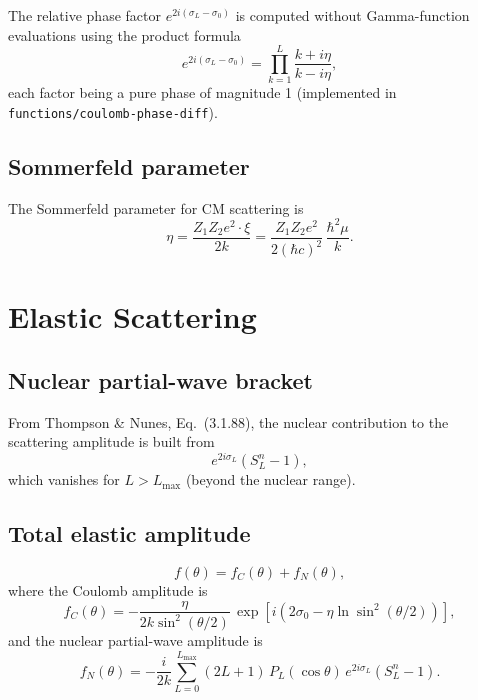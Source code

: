\documentclass[12pt,a4paper]{article}
\begin{document}
The relative phase factor $e^{2i(\sigma_L-\sigma_0)}$ is computed
without Gamma-function evaluations using the product formula
\begin{equation}
  e^{2i(\sigma_L - \sigma_0)} =
  \prod_{k=1}^{L} \frac{k + i\eta}{k - i\eta},
  \label{eq:coulomb-phase-diff}
\end{equation}
each factor being a pure phase of magnitude 1
(implemented in \texttt{functions/coulomb-phase-diff}).

\subsection{Sommerfeld parameter}

The Sommerfeld parameter for CM scattering is
\begin{equation}
  \eta = \frac{Z_1 Z_2 e^2 \cdot \xi}{2k}
       = \frac{Z_1 Z_2 e^2}{2(\hbar c)^2}\,\frac{\hbar^2 \mu}{k}.
  \label{eq:sommerfeld}
\end{equation}

\section{Elastic Scattering}

\subsection{Nuclear partial-wave bracket}

From Thompson \& Nunes, Eq.~(3.1.88), the nuclear contribution to the
scattering amplitude is built from
\begin{equation}
  e^{2i\sigma_L}\!\left(S_L^n - 1\right),
  \label{eq:nuclear-bracket}
\end{equation}
which vanishes for $L > L_\mathrm{max}$ (beyond the nuclear range).

\subsection{Total elastic amplitude}

\begin{equation}
  f(\theta) = f_C(\theta) + f_N(\theta),
\end{equation}
where the Coulomb amplitude is
\begin{equation}
  f_C(\theta) = -\frac{\eta}{2k\sin^2(\theta/2)}\,
  \exp\!\left[i\!\left(2\sigma_0 - \eta\ln\sin^2(\theta/2)\right)\right],
  \label{eq:fc}
\end{equation}
and the nuclear partial-wave amplitude is
\begin{equation}
  f_N(\theta) = -\frac{i}{2k}\sum_{L=0}^{L_\mathrm{max}}
  (2L+1)\,P_L(\cos\theta)\,e^{2i\sigma_L}\!\left(S_L^n - 1\right).
  \label{eq:fn}
\end{equation}
\end{document}
